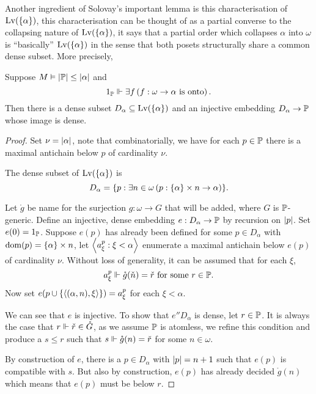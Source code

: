 Another ingredient of Solovay's important lemma is this characterisation of \(\Lv(\set{\alpha})\),
this characterisation can be thought of as a partial converse to the collapsing nature of \(\Lv(\set{\alpha})\),
it says that a partial order which collapses \(\alpha\) into \(\omega\) is ``basically'' \(\Lv(\set{\alpha})\)
in the sense that both posets structurally share a common dense subset.
More precisely,
\begin{lemma}\label{lemma:characterisation_collapse}
    Suppose \(M\models \abs{\P} \leq \abs{\alpha}\) and
    \[ 1_\P \forces \exists f\paren{f:\omega\to\alpha \text{ is onto}}.\]
    Then there is a dense subset \(D_\alpha\subseteq \Lv(\set{\alpha})\)
    and an injective embedding \(D_\alpha \to \P\) whose image is dense.
\end{lemma}
\begin{proof}
    Set \(\nu = \abs{\alpha}\),
    note that combinatorially, we have for each \(p\in\P\) there is a maximal antichain below \(p\) of cardinality \(\nu\).

    The dense subset of \(\Lv(\set{\alpha})\) is
    \[ D_\alpha = \set{p: \exists n\in\omega \paren{p: \set{\alpha}\times n\to \alpha}}.\]

    Let \(\mathring{g}\) be name for the surjection \(g:\omega\to G\) that will be added, where \(G\) is \(\P\)-generic.
    Define an injective, dense embedding \(e: D_\alpha\to\P\) by recursion on \(\abs{p}\).
    Set \(e(0) = 1_\P\).
    Suppose \(e(p)\) has already been defined for some \(p\in D_\alpha\) with \(\dom(p) = \set{\alpha}\times n\),
    let \(\Angle{a_\xi^p: \xi<\alpha}\) enumerate a maximal antichain below \(e(p)\) of cardinality \(\nu\).
    Without loss of generality, it can be assumed that for each \(\xi\),
    \[ a_\xi^p \forces \mathring{g}(\check{n}) = \check{r} \text{ for some } r\in \P. \]
    Now set \(e(p\cup \set{\Angle{(\alpha, n), \xi}}) = a_\xi^p\) for each \(\xi<\alpha\).

    We can see that \(e\) is injective.
    To show that \(e''D_\alpha\) is dense, let \(r\in \P\).
    It is always the case that \(r\forces \check{r}\in\mathring{G}\),
    as we assume \(\P\) is atomless, we refine this condition and produce a \(s\leq r\)
    such that \(s\forces \mathring{g}(n) = \check{r}\) for some \(n\in\omega\).

    By construction of \(e\), there is a \(p\in D_\alpha\) with \(\abs{p} = n+1\) such that \(e(p)\) is compatible with \(s\).
    But also by construction, \(e(p)\) has already decided \(\mathring{g}(n)\) which means that \(e(p)\) must be below \(r\).
\end{proof}

